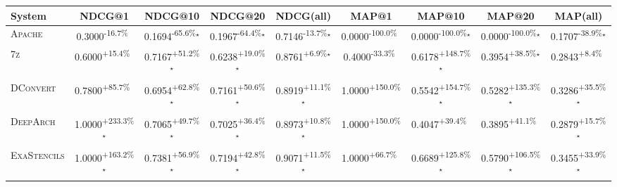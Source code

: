 \begin{table}[htbp]
\centering
\renewcommand{\arraystretch}{1.2}
\begin{tabular}{l|cccc|cccc}
\hline
System & NDCG@1 & NDCG@10 & NDCG@20 & NDCG(all) & MAP@1 & MAP@10 & MAP@20 & MAP(all) \\ \hline
\textsc{Apache} & \cellcolor{red!30}0.3000\textsuperscript{-16.7\%}$^{\,\,\,}$ & \cellcolor{red!30}0.1694\textsuperscript{-65.6\%}$^\star$ & \cellcolor{red!30}0.1967\textsuperscript{-64.4\%}$^\star$ & \cellcolor{red!30}0.7146\textsuperscript{-13.7\%}$^\star$ & \cellcolor{red!30}0.0000\textsuperscript{-100.0\%}$^{\,\,\,}$ & \cellcolor{red!30}0.0000\textsuperscript{-100.0\%}$^\star$ & \cellcolor{red!30}0.0000\textsuperscript{-100.0\%}$^\star$ & \cellcolor{red!30}0.1707\textsuperscript{-38.9\%}$^\star$ \\
\textsc{7z} & \cellcolor{green!30}0.6000\textsuperscript{+15.4\%}$^{\,\,\,}$ & \cellcolor{green!30}0.7167\textsuperscript{+51.2\%}$^\star$ & \cellcolor{green!30}0.6238\textsuperscript{+19.0\%}$^\star$ & \cellcolor{green!30}0.8761\textsuperscript{+6.9\%}$^\star$ & \cellcolor{red!30}0.4000\textsuperscript{-33.3\%}$^{\,\,\,}$ & \cellcolor{green!30}0.6178\textsuperscript{+148.7\%}$^\star$ & \cellcolor{green!30}0.3954\textsuperscript{+38.5\%}$^\star$ & \cellcolor{green!30}0.2843\textsuperscript{+8.4\%}$^{\,\,\,}$ \\
\textsc{DConvert} & \cellcolor{green!30}0.7800\textsuperscript{+85.7\%}$^{\,\,\,}$ & \cellcolor{green!30}0.6954\textsuperscript{+62.8\%}$^\star$ & \cellcolor{green!30}0.7161\textsuperscript{+50.6\%}$^\star$ & \cellcolor{green!30}0.8919\textsuperscript{+11.1\%}$^\star$ & \cellcolor{green!30}1.0000\textsuperscript{+150.0\%}$^{\,\,\,}$ & \cellcolor{green!30}0.5542\textsuperscript{+154.7\%}$^\star$ & \cellcolor{green!30}0.5282\textsuperscript{+135.3\%}$^\star$ & \cellcolor{green!30}0.3286\textsuperscript{+35.5\%}$^\star$ \\
\textsc{DeepArch} & \cellcolor{green!30}1.0000\textsuperscript{+233.3\%}$^\star$ & \cellcolor{green!30}0.7065\textsuperscript{+49.7\%}$^\star$ & \cellcolor{green!30}0.7025\textsuperscript{+36.4\%}$^\star$ & \cellcolor{green!30}0.8973\textsuperscript{+10.8\%}$^\star$ & \cellcolor{green!30}1.0000\textsuperscript{+150.0\%}$^{\,\,\,}$ & \cellcolor{green!30}0.4047\textsuperscript{+39.4\%}$^{\,\,\,}$ & \cellcolor{green!30}0.3895\textsuperscript{+41.1\%}$^{\,\,\,}$ & \cellcolor{green!30}0.2879\textsuperscript{+15.7\%}$^\star$ \\
\textsc{ExaStencils} & \cellcolor{green!30}1.0000\textsuperscript{+163.2\%}$^\star$ & \cellcolor{green!30}0.7381\textsuperscript{+56.9\%}$^\star$ & \cellcolor{green!30}0.7194\textsuperscript{+42.8\%}$^\star$ & \cellcolor{green!30}0.9071\textsuperscript{+11.5\%}$^\star$ & \cellcolor{green!30}1.0000\textsuperscript{+66.7\%}$^{\,\,\,}$ & \cellcolor{green!30}0.6689\textsuperscript{+125.8\%}$^\star$ & \cellcolor{green!30}0.5790\textsuperscript{+106.5\%}$^\star$ & \cellcolor{green!30}0.3455\textsuperscript{+33.9\%}$^\star$ \\

\end{tabular}
\end{table}
